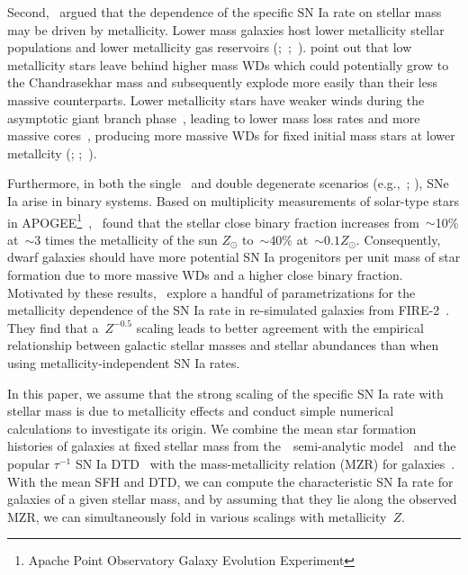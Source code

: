 \documentclass[ms.tex]{subfiles}
\begin{document}
Second,~\citet{Kistler2013} argued that the dependence of the specific SN Ia
rate on stellar mass may be driven by metallicity.
Lower mass galaxies host lower metallicity stellar populations
\citep{Gallazzi2005, Kirby2013} and lower metallicity gas reservoirs
(\citealp{Tremonti2004};~\citealp*{Zahid2011};~\citealp{Andrews2013,
Zahid2014}).
\citet{Kistler2013} point out that low metallicity stars leave behind higher
mass WDs which could potentially grow to the Chandrasekhar mass and
subsequently explode more easily than their less massive counterparts.
Lower metallicity stars have weaker winds during the asymptotic giant branch
phase~\citep{Willson2000, Marigo2007}, leading to lower mass loss rates and
more massive cores~\citep{Kalirai2014}, producing more massive WDs for fixed
initial mass stars at lower metallcity (\citealp{Umeda1999};
\citealp*{Meng2008};~\citealp{Zhao2012}).
\par
Furthermore, in both the single~\citep[e.g.,][]{Whelan1973} and double
degenerate scenarios (e.g.,~\mbox{\citealp{Iben1984}};
\mbox{\citealp{Webbink1984}}), SNe Ia arise in binary systems.
Based on multiplicity measurements of solar-type stars in APOGEE\footnote{
	Apache Point Observatory Galaxy Evolution Experiment
}~\citep{Majewski2017},~\citet*{Moe2019} found that the stellar close binary
fraction increases from~$\sim$10\% at~$\sim$3 times the metallicity of the sun
$Z_\odot$ to~$\sim$40\% at~$\sim$$0.1 Z_\odot$.
Consequently, dwarf galaxies should have more potential SN Ia progenitors per
unit mass of star formation due to more massive WDs and a higher close binary
fraction.
Motivated by these results,~\citet{Gandhi2022} explore a handful of
parametrizations for the metallicity dependence of the SN Ia rate in
re-simulated galaxies from FIRE-2~\citep{Hopkins2018}.
They find that a~$Z^{-0.5}$ scaling leads to better agreement with the empirical
relationship between galactic stellar masses and stellar abundances than when
using metallicity-independent SN Ia rates.
\par
In this paper, we assume that the strong scaling of the specific SN Ia rate
with stellar mass is due to metallicity effects and conduct simple numerical
calculations to investigate its origin.
We combine the mean star formation histories of galaxies at fixed stellar
mass from the~\um~semi-analytic model~\citep{Behroozi2019} and the popular
$\tau^{-1}$ SN Ia DTD~\citep[e.g.,][]{Maoz2012a} with the mass-metallicity
relation (MZR) for galaxies~\citep{Tremonti2004, Andrews2013, Zahid2011,
Zahid2014}.
With the mean SFH and DTD, we can compute the characteristic SN Ia rate for
galaxies of a given stellar mass, and by assuming that they lie along the
observed MZR, we can simultaneously fold in various scalings with
metallicity~$Z$.
\end{document}
